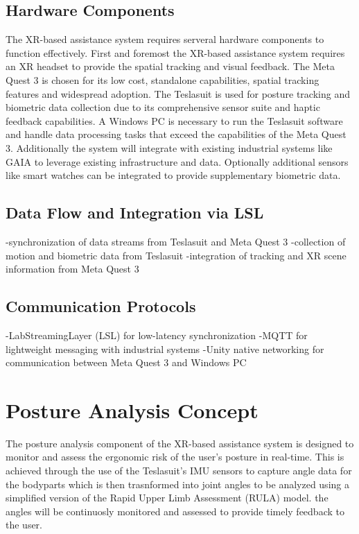 \subsection{Hardware Components}
The XR-based assistance system requires serveral hardware components to function effectively. First and foremost the XR-based assistance system requires an XR headset to provide the spatial tracking and visual feedback. The Meta Quest 3 is chosen for its low cost, standalone capabilities, spatial tracking features and widespread adoption. The Teslasuit is used for posture tracking and biometric data collection due to its comprehensive sensor suite and haptic feedback capabilities. A Windows PC is necessary to run the Teslasuit software and handle data processing tasks that exceed the capabilities of the Meta Quest 3. Additionally the system will integrate with existing industrial systems like GAIA to leverage existing infrastructure and data. Optionally additional sensors like smart watches can be integrated to provide supplementary biometric data.

\subsection{Data Flow and Integration via LSL}
-synchronization of data streams from Teslasuit and Meta Quest 3 
-collection of motion and biometric data from Teslasuit
-integration of tracking and XR scene information from Meta Quest 3

\subsection{Communication Protocols}
-LabStreamingLayer (LSL) for low-latency synchronization
-MQTT for lightweight messaging with industrial systems
-Unity native networking for communication between Meta Quest 3 and Windows PC

\section{Posture Analysis Concept}
The posture analysis component of the XR-based assistance system is designed to monitor and assess the ergonomic risk of the user's posture in real-time. This is achieved through the use of the Teslasuit's IMU sensors to capture angle data for the bodyparts which is then trasnformed into joint angles to be analyzed using a simplified version of the Rapid Upper Limb Assessment (RULA) model. the angles will be continuosly monitored and assessed to provide timely feedback to the user.
